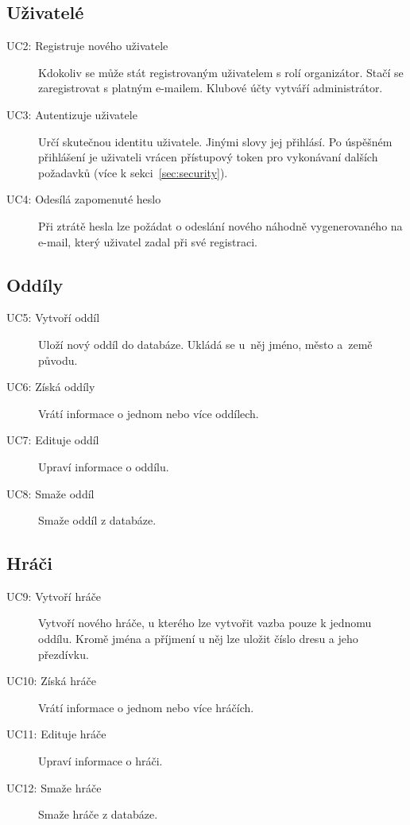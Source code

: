 \subsection*{Uživatelé}
  \begin{description}
    \item[UC2: Registruje nového uživatele]
      Kdokoliv se může stát registrovaným uživatelem s rolí organizátor. Stačí se zaregistrovat s platným e-mailem.
      Klubové účty vytváří administrátor.
    \item[UC3: Autentizuje uživatele]
      Určí skutečnou identitu uživatele. Jinými slo\-vy jej přihlásí. Po úspěšném přihlášení je uživateli vrácen
      přístupový token pro vykonávaní dalších požadavků (více k sekci~\ref{sec:security}).
    \item[UC4: Odesílá zapomenuté heslo]
      Při ztrátě hesla lze požádat o odeslání nového náhodně vygenerovaného na e-mail, který uživatel zadal při své registraci.
  \end{description}

\subsection*{Oddíly}
  \begin{description}
    \item[UC5: Vytvoří oddíl]
      Uloží nový oddíl do databáze. Ukládá se u~něj jméno, město a~země původu.
    \item[UC6: Získá oddíly]
      Vrátí informace o jednom nebo více oddílech.
    \item[UC7: Edituje oddíl]
      Upraví informace o oddílu.
    \item[UC8: Smaže oddíl]
      Smaže oddíl z databáze.
  \end{description}

\subsection*{Hráči}
  \begin{description}
    \item[UC9: Vytvoří hráče]
      Vytvoří nového hráče, u kterého lze vytvořit vazba pouze k jednomu oddílu.
      Kromě jména a příjmení u něj lze uložit číslo dresu a jeho přezdívku.
    \item[UC10: Získá hráče]
      Vrátí informace o jednom nebo více hráčích.
    \item[UC11: Edituje hráče]
      Upraví informace o hráči.
    \item[UC12: Smaže hráče]
      Smaže hráče z databáze.
  \end{description}

